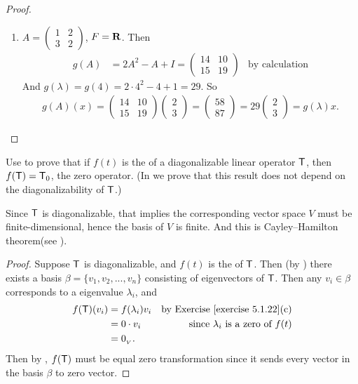 \begin{proof}
\begin{enumerate}
\item
\(A = \begin{pmatrix} 1 & 2 \\ 3 & 2 \end{pmatrix}\), \(F = \mathbf{R}\).
Then
\begin{align*}
    g(A) & = 2A^2 - A + I = \begin{pmatrix} 14 & 10 \\ 15 & 19 \end{pmatrix} & \text{by calculation}
\end{align*}
And \(g(\lambda) = g(4) = 2 \cdot 4^2 - 4 + 1 = 29\).
So
\begin{align*}
    g(A)(x) = \begin{pmatrix} 14 & 10 \\ 15 & 19 \end{pmatrix}
    \begin{pmatrix} 2 \\ 3 \end{pmatrix}
    = \begin{pmatrix} 58 \\ 87 \end{pmatrix}
    = 29 \begin{pmatrix} 2 \\ 3 \end{pmatrix}
    = g(\lambda) x.
\end{align*}
\end{enumerate}
\end{proof}

\begin{exercise} \label{exercise 5.1.23}
Use  to prove that if \(f(t)\) is the \CPOLY{} of a diagonalizable linear operator \(\textsf{T}\), then \(f(\textsf{T}) = \textsf{T}_0\), the zero operator.
(In  we prove that this result does not depend on the diagonalizability of \(\textsf{T}\).)
\end{exercise}

\begin{note}
Since \(\textsf{T}\) is diagonalizable, that implies the corresponding vector space \(V\) must be finite-dimensional, hence the basis of \(V\) is finite.
And this is Cayley–Hamilton theorem(see ).
\end{note}

\begin{proof}
Suppose \(\textsf{T}\) is diagonalizable, and \(f(t)\) is the \CPOLY{} of \(\textsf{T}\).
Then (by ) there exists a basis \(\beta = \{ v_1, v_2, ..., v_n \}\) consisting of eigenvectors of \(\textsf{T}\).
Then any \(v_i \in \beta\) corresponds to a eigenvalue \(\lambda_i\), and
\begin{align*}
    f(\T)(v_i) & = f(\lambda_i) v_i & \text{by \EXEC{5.1.22}(c)} \\
               & = 0 \cdot v_i & \text{since \(\lambda_i\) is a zero of \(f(t)\)} \\
               & = \OV.
\end{align*}
Then by , \(f(\textsf{T})\) must be equal zero transformation since it sends every vector in the basis \(\beta\) to zero vector.
\end{proof}

